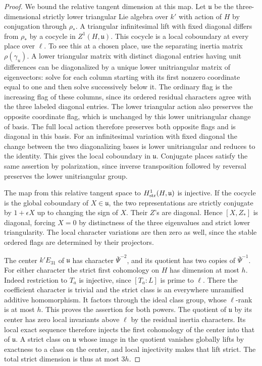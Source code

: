 \documentclass[a4paper,11pt]{article}
\theoremstyle{definition}
\theoremstyle{remark}
\numberwithin{equation}{section}
\begin{document}
\begin{proof}
We bound the relative tangent dimension at this map. Let
\(\mathfrak u\) be the three-dimensional strictly lower triangular
Lie algebra over \(k'\) with action of \(H\) by conjugation
through \(\rho_*\). A triangular infinitesimal lift with
fixed diagonal differs from \(\rho_*\) by a cocycle in
\(Z^1(H,\mathfrak u)\). This cocycle is a local coboundary at
every place over \(\ell\). To see this at a chosen place, use
the separating inertia matrix \(\rho(\gamma_u)\).
A lower triangular matrix with distinct diagonal entries
having unit differences can be diagonalized by a unique
lower unitriangular matrix of eigenvectors: solve for each
column starting with its first nonzero coordinate equal to
one and then solve successively below it. The ordinary flag
is the increasing flag of these columns, since its ordered
residual characters agree with the three labeled diagonal
entries. The lower triangular action also preserves the
opposite coordinate flag, which is unchanged by this lower
unitriangular change of basis. The full local action therefore
preserves both opposite flags and is diagonal in this basis.
For an infinitesimal variation with fixed diagonal the change
between the two diagonalizing bases is lower unitriangular and
reduces to the identity. This gives the local coboundary in
\(\mathfrak u\). Conjugate places satisfy the same assertion
by polarization, since inverse transposition followed by
reversal preserves the lower unitriangular group.

The map from this relative tangent space to
\(H^1_{\rm str}(H,\mathfrak u)\) is injective. If the cocycle
is the global coboundary of \(X\in\mathfrak u\), the two
representations are strictly conjugate by \(1+\epsilon X\)
up to changing the sign of \(X\). Their \(Z\)'s are diagonal.
Hence \([X,Z_*]\) is diagonal, forcing \(X=0\) by distinctness
of the three eigenvalues and strict lower triangularity.
The local character variations are then zero as well, since
the stable ordered flags are determined by their projectors.

The center \(k'E_{31}\) of \(\mathfrak u\) has character
\(\bar\Psi^{-2}\), and its quotient has two copies of
\(\bar\Psi^{-1}\). For either character the strict first
cohomology on \(H\) has dimension at most \(h\). Indeed
restriction to \(T_a\) is injective, since \([T_a:L]\) is
prime to \(\ell\). There the coefficient character is trivial
and the strict class is an everywhere unramified additive
homomorphism. It factors through the ideal class group,
whose \(\ell\)-rank is at most \(h\). This proves the assertion
for both powers. The quotient of \(\mathfrak u\) by its center
has zero local invariants above \(\ell\) by the residual inertia
characters. Its local exact sequence therefore injects the
first cohomology of the center into that of \(\mathfrak u\).
A strict class on \(\mathfrak u\) whose image in the quotient
vanishes globally lifts by exactness to a class on the center,
and local injectivity makes that lift strict. The total strict
dimension is thus at most \(3h\).


\end{proof}
\end{document}
